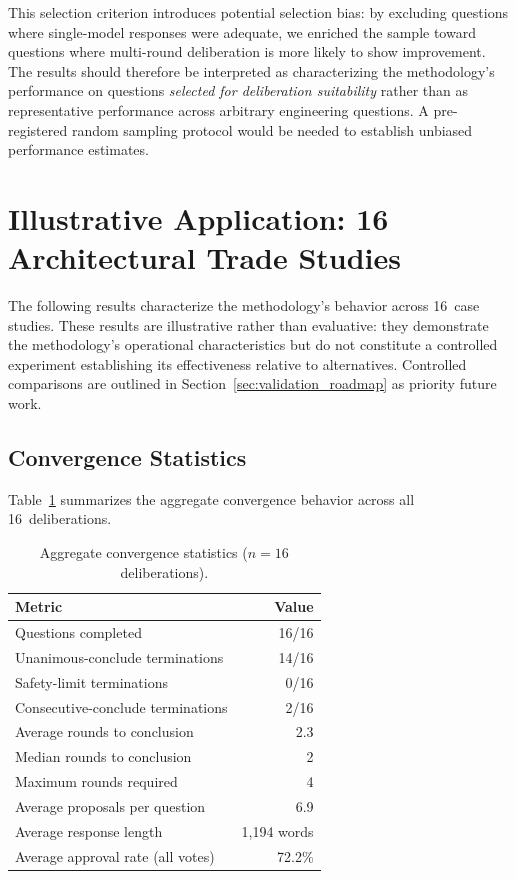 \documentclass[11pt,a4paper]{article}
\begin{document}
This selection criterion introduces potential selection bias: by excluding questions where single-model responses were adequate, we enriched the sample toward questions where multi-round deliberation is more likely to show improvement. The results should therefore be interpreted as characterizing the methodology's performance on questions \emph{selected for deliberation suitability} rather than as representative performance across arbitrary engineering questions. A pre-registered random sampling protocol would be needed to establish unbiased performance estimates.

\section{Illustrative Application: 16 Architectural Trade Studies}
\label{sec:results}

The following results characterize the methodology's behavior across 16~case studies. These results are illustrative rather than evaluative: they demonstrate the methodology's operational characteristics but do not constitute a controlled experiment establishing its effectiveness relative to alternatives. Controlled comparisons are outlined in Section~\ref{sec:validation_roadmap} as priority future work.

\subsection{Convergence Statistics}

Table~\ref{tab:convergence} summarizes the aggregate convergence behavior across all 16~deliberations.

\begin{table}[ht]
\centering
\caption{Aggregate convergence statistics ($n = 16$ deliberations).}
\label{tab:convergence}
\begin{tabular}{@{}lr@{}}
\toprule
\textbf{Metric} & \textbf{Value} \\
\midrule
Questions completed & 16/16 \\
Unanimous-conclude terminations & 14/16 \\
Safety-limit terminations & 0/16 \\
Consecutive-conclude terminations & 2/16 \\
Average rounds to conclusion & 2.3 \\
Median rounds to conclusion & 2 \\
Maximum rounds required & 4 \\
Average proposals per question & 6.9 \\
Average response length & 1{,}194 words \\
Average approval rate (all votes) & 72.2\% \\
\bottomrule
\end{tabular}
\end{table}
\end{document}
